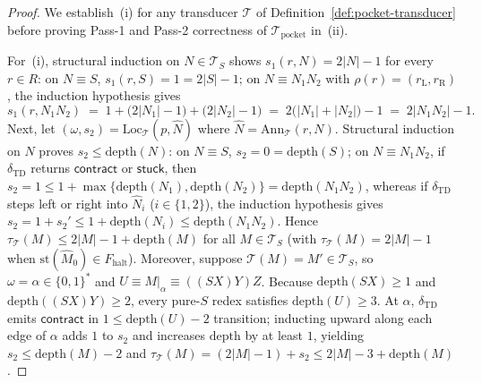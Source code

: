 \documentclass[11pt,reqno]{amsart}
\numberwithin{equation}{section}
\theoremstyle{plain}
\theoremstyle{definition}
\theoremstyle{remark}
\newcommand{\TS}{\mathcal{T}_S}
\begin{document}
\begin{proof}
We establish~(i) for any transducer $\mathcal{T}$ of Definition~\ref{def:pocket-transducer} before proving Pass-1 and Pass-2 correctness of $\mathcal{T}_{\mathrm{pocket}}$ in~(ii).

For~(i), structural induction on $N \in \TS$ shows $s_1(r, N) = 2|N| - 1$ for every $r \in R$: on $N \equiv S$, $s_1(r, S) = 1 = 2|S| - 1$; on $N \equiv N_1 N_2$ with $\rho(r) = (r_{\mathrm{L}}, r_{\mathrm{R}})$, the induction hypothesis gives
\[
  s_1(r, N_1 N_2) \;=\; 1 + \bigl(2|N_1| - 1\bigr) + \bigl(2|N_2| - 1\bigr) \;=\; 2\bigl(|N_1| + |N_2|\bigr) - 1 \;=\; 2|N_1 N_2| - 1.
\]
Next, let $(\omega, s_2) = \mathrm{Loc}_{\mathcal{T}}(p, \widehat{N})$ where $\widehat{N} = \mathrm{Ann}_{\mathcal{T}}(r, N)$. Structural induction on $N$ proves $s_2 \le \mathrm{depth}(N)$: on $N \equiv S$, $s_2 = 0 = \mathrm{depth}(S)$; on $N \equiv N_1 N_2$, if $\delta_{\mathrm{TD}}$ returns $\mathsf{contract}$ or $\mathsf{stuck}$, then $s_2 = 1 \le 1 + \max\{\mathrm{depth}(N_1), \mathrm{depth}(N_2)\} = \mathrm{depth}(N_1 N_2)$, whereas if $\delta_{\mathrm{TD}}$ steps left or right into $\widehat{N}_i$ ($i \in \{1, 2\}$), the induction hypothesis gives $s_2 = 1 + s_2' \le 1 + \mathrm{depth}(N_i) \le \mathrm{depth}(N_1 N_2)$. Hence $\tau_{\mathcal{T}}(M) \le 2|M| - 1 + \mathrm{depth}(M)$ for all $M \in \TS$ (with $\tau_{\mathcal{T}}(M) = 2|M| - 1$ when $\mathrm{st}(\widehat{M}_0) \in F_{\mathrm{halt}}$). Moreover, suppose $\mathcal{T}(M) = M' \in \TS$, so $\omega = \alpha \in \{0,1\}^*$ and $U \equiv M|_{\alpha} \equiv ((S X) Y) Z$. Because $\mathrm{depth}(S X) \ge 1$ and $\mathrm{depth}((S X) Y) \ge 2$, every pure-$S$ redex satisfies $\mathrm{depth}(U) \ge 3$. At $\alpha$, $\delta_{\mathrm{TD}}$ emits $\mathsf{contract}$ in $1 \le \mathrm{depth}(U) - 2$ transition; inducting upward along each edge of $\alpha$ adds $1$ to $s_2$ and increases $\mathrm{depth}$ by at least $1$, yielding $s_2 \le \mathrm{depth}(M) - 2$ and $\tau_{\mathcal{T}}(M) = (2|M| - 1) + s_2 \le 2|M| - 3 + \mathrm{depth}(M)$.


\end{proof}
\end{document}
